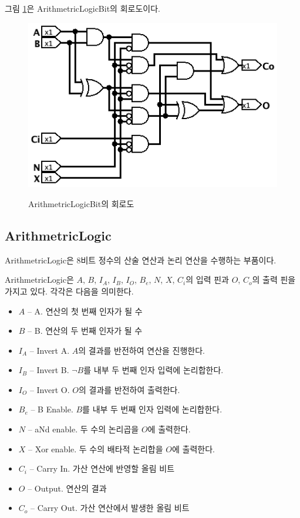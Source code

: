 \documentclass{article}
\renewcommand{\figurename}{그림}
\begin{document}
\figurename{} \ref{fig:alb}은 ArithmetricLogicBit의 회로도이다.

\begin{figure}[h]
    \centering
    \includegraphics[scale=0.5]{ArithmetricLogicBit} \\
    \caption{ArithmetricLogicBit의 회로도}
    \label{fig:alb}
\end{figure}

\subsection{ArithmetricLogic}

ArithmetricLogic은 8비트 정수의 산술 연산과 논리 연산을 수행하는 부품이다.

ArithmetricLogic은 $A$, $B$, $I_A$, $I_B$, $I_O$, $B_e$, $N$, $X$, $C_i$의 입력 핀과
$O$, $C_o$의 출력 핀을 가지고 있다.
각각은 다음을 의미한다.

\begin{itemize}
    \item $A$ -- A. 연산의 첫 번째 인자가 될 수
    \item $B$ -- B. 연산의 두 번째 인자가 될 수
    \item $I_A$ -- Invert A. $A$의 결과를 반전하여 연산을 진행한다.
    \item $I_B$ -- Invert B. $\neg B$를 내부 두 번째 인자 입력에 논리합한다.
    \item $I_O$ -- Invert O. $O$의 결과를 반전하여 출력한다.
    \item $B_e$ -- B Enable. $B$를 내부 두 번째 인자 입력에 논리합한다.
    \item $N$ -- aNd enable. 두 수의 논리곱을 $O$에 출력한다.
    \item $X$ -- Xor enable. 두 수의 배타적 논리합을 $O$에 출력한다.
    \item $C_i$ -- Carry In. 가산 연산에 반영할 올림 비트
    \item $O$ -- Output. 연산의 결과
    \item $C_o$ -- Carry Out. 가산 연산에서 발생한 올림 비트
\end{itemize}
\end{document}

